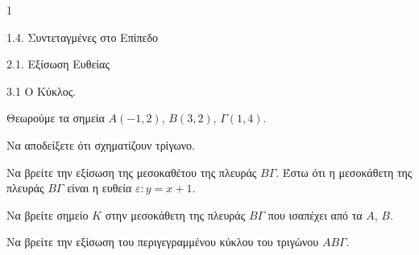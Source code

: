 \begin{ylh}{1}
    \item 1.4. Συντεταγμένες στο Επίπεδο
    \item 2.1. Εξίσωση Ευθείας
    \item 3.1 Ο Κύκλος.
\end{ylh}
Θεωρούμε τα σημεία $A(-1, 2)$, $B(3, 2)$, $\Gamma(1, 4)$.
\begin{alist}
\item Να αποδείξετε ότι σχηματίζουν τρίγωνο. 
\item Να βρείτε την εξίσωση της μεσοκαθέτου της πλευράς $B\Gamma$. 
Έστω ότι η μεσοκάθετη της πλευράς $B\Gamma$ είναι η ευθεία $\varepsilon: y=x+1$.
\item Να βρείτε σημείο $K$ στην μεσοκάθετη της πλευράς $B\Gamma$ που ισαπέχει από τα $A$, $B$. 
\item Να βρείτε την εξίσωση του περιγεγραμμένου κύκλου του τριγώνου $AB\Gamma$. 
\end{alist}
